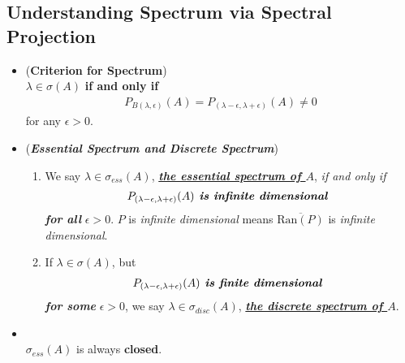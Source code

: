 \documentclass[11pt]{article}
\begin{document}
\subsection{Understanding Spectrum via Spectral Projection}
\begin{itemize}
\item \begin{proposition} (\textbf{Criterion for  Spectrum}) \citep{reed1980methods}\\
$\lambda \in \sigma(A)$ \textbf{if and only if} 
\begin{align*}
P_{B(\lambda, \epsilon)}(A) = P_{(\lambda -\epsilon, \lambda + \epsilon)}(A) \neq 0
\end{align*}  for any $\epsilon > 0$. 
\end{proposition}

\item \begin{definition} (\emph{\textbf{Essential Spectrum and Discrete Spectrum}}) 
\begin{enumerate}
\item We say $\lambda \in \sigma_{ess}(A)$, \underline{\emph{\textbf{the essential spectrum of $A$}}}, \emph{if and only if} 
\begin{align*}
P_{(\lambda -\epsilon, \lambda + \epsilon)}(A) \text{\emph{\textbf{ is infinite dimensional }}}
\end{align*}
\emph{\textbf{for all}} $\epsilon > 0$. $P$ is \emph{infinite dimensional} means $\overline{\text{Ran}(P)}$ is \emph{infinite dimensional}. 
\item If $\lambda \in \sigma(A)$, but 
\begin{align*}
P_{(\lambda -\epsilon, \lambda + \epsilon)}(A) \text{\emph{\textbf{ is finite dimensional }}}
\end{align*}
\emph{\textbf{for some}} $\epsilon > 0$, we say $\lambda \in \sigma_{disc}(A)$, \underline{\emph{\textbf{the discrete spectrum of $Α$}}}.
\end{enumerate}

\end{definition}

\item \begin{proposition} \citep{reed1980methods}\\
$\sigma_{ess}(A)$ is always \textbf{closed}. 
\end{proposition}


\end{itemize}
\end{document}
